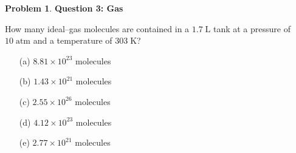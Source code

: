 \documentclass[10pt]{article}
\theoremstyle{definition} %
\newtheorem{problem}{Problem}
\theoremstyle{plain} %
\begin{document}
                                            \begin{problem}
                                              \textbf{Question 3: Gas}
                                              
                                              How many ideal–gas molecules are contained in a \(1.7\;\text{L}\) tank at a
                                              pressure of \(10\;\text{atm}\) and a temperature of \(303\;\text{K}\)?
                                              
                                              \begin{enumerate}
                                                \item[(a)] \(8.81\times10^{23}\) molecules
                                                \item[(b)] \(1.43\times10^{21}\) molecules
                                                \item[(c)] \(2.55\times10^{26}\) molecules
                                                \item[(d)] \(4.12\times10^{23}\) molecules  %
                                                \item[(e)] \(2.77\times10^{21}\) molecules
                                              \end{enumerate}
                                              \end{problem}
\end{document}
